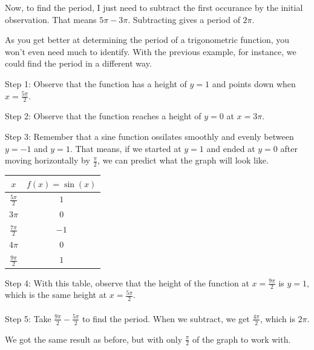 Now, to find the period, I just need to subtract the first occurance by the initial observation. That means $5\pi - 3\pi$. Subtracting gives a period of $2\pi$.

As you get better at determining the period of a trigonometric function, you won't even need much to identify. With the previous example, for instance, we could find the period in a different way.

Step 1: Observe that the function has a height of $y = 1$ and points down when $x = \frac{5\pi}{2}$.

Step 2: Observe that the function reaches a height of $y = 0$ at $x = 3\pi$.

Step 3: Remember that a sine function ossilates smoothly and evenly between $y = -1$ and $y = 1$. That means, if we started at $y = 1$ and ended at $y = 0$ after moving horizontally by $\frac{\pi}{2}$, we can predict what the graph will look like.
\begin{center}
    \begin{minipage}[c]{0.3\linewidth}
        \begin{tabular}{ c | c }
            $x$ & $f(x) = \sin(x)$ \\
            \hline
            $\frac{5\pi}{2}$ & $1$ \\
            \hline
            $3\pi$ & $0$ \\
            \hline
            $\frac{7\pi}{2}$ & $-1$ \\
            \hline
            $4\pi$ & $0$ \\
            \hline
            $\frac{9\pi}{2}$ & $1$ \\
        \end{tabular}
    \end{minipage}
    \begin{minipage}[c]{0.69\linewidth}
        Step 4: With this table, observe that the height of the function at $x = \frac{9\pi}{2}$ is $y = 1$, which is the same height at $x = \frac{5\pi}{2}$. 
        \\ \\
        Step 5: Take $\frac{9\pi}{2} - \frac{5\pi}{2}$ to find the period. When we subtract, we get $\frac{4\pi}{2}$, which is $2\pi$. 
    \end{minipage}
\end{center}
We got the same result as before, but with only $\frac{\pi}{2}$ of the graph to work with.